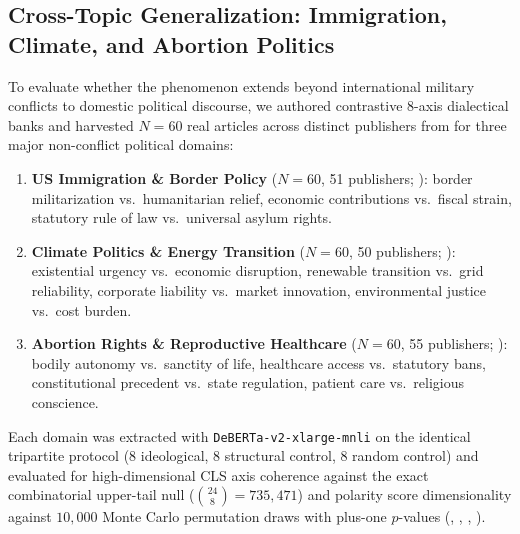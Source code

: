 \subsection{Cross-Topic Generalization: Immigration, Climate, and Abortion Politics}
\label{sec:cross_topic_results}

To evaluate whether the phenomenon extends beyond international military conflicts to domestic political discourse, we authored contrastive 8-axis dialectical banks and harvested $N=60$ real articles across distinct publishers from  for three major non-conflict political domains:
\begin{enumerate}
    \item \textbf{US Immigration \& Border Policy} ($N=60$, 51 publishers; ): border militarization vs.\ humanitarian relief, economic contributions vs.\ fiscal strain, statutory rule of law vs.\ universal asylum rights.
    \item \textbf{Climate Politics \& Energy Transition} ($N=60$, 50 publishers; ): existential urgency vs.\ economic disruption, renewable transition vs.\ grid reliability, corporate liability vs.\ market innovation, environmental justice vs.\ cost burden.
    \item \textbf{Abortion Rights \& Reproductive Healthcare} ($N=60$, 55 publishers; ): bodily autonomy vs.\ sanctity of life, healthcare access vs.\ statutory bans, constitutional precedent vs.\ state regulation, patient care vs.\ religious conscience.
\end{enumerate}

Each domain was extracted with \texttt{DeBERTa-v2-xlarge-mnli} on the identical tripartite protocol (8 ideological, 8 structural control, 8 random control) and evaluated for high-dimensional CLS axis coherence against the exact combinatorial upper-tail null ($\binom{24}{8} = 735{,}471$) and polarity score dimensionality against $10{,}000$ Monte Carlo permutation draws with plus-one $p$-values (, , , ).

